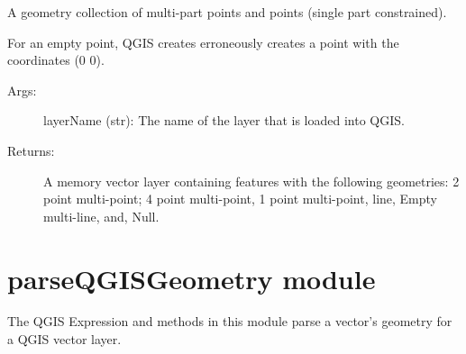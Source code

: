 \documentclass[letterpaper,11pt,english]{sphinxmanual}
\begin{document}

\begin{fulllineitems}
\label{\detokenize{API:modelVectorLayers.createMultiPoints}}
A geometry collection of multi-part points and points (single part constrained).

For an empty point, QGIS creates erroneously creates a point with the coordinates (0 0).
\begin{description}
\item[{Args:}] \leavevmode
layerName (str): The name of the layer that is loaded into QGIS.

\item[{Returns:}] \leavevmode
A memory vector layer containing features with the following geometries: 2 point multi-point; 4 point multi-point,
1 point multi-point, line, Empty multi-line, and, Null.

\end{description}

\end{fulllineitems}



\section{parseQGISGeometry module}
\label{\detokenize{API:module-parseQGISGeometry}}\label{\detokenize{API:parseqgisgeometry-module}}\label{\detokenize{API:parseqgisgeometry-api}}
The QGIS Expression and methods in this module parse a vector’s geometry for a QGIS vector layer.
\end{document}
